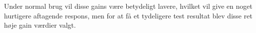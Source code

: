 Under normal brug vil disse gains være betydeligt lavere, hvilket vil give en noget hurtigere aftagende respons, men for at få et tydeligere test resultat blev disse ret høje gain værdier valgt.
%

